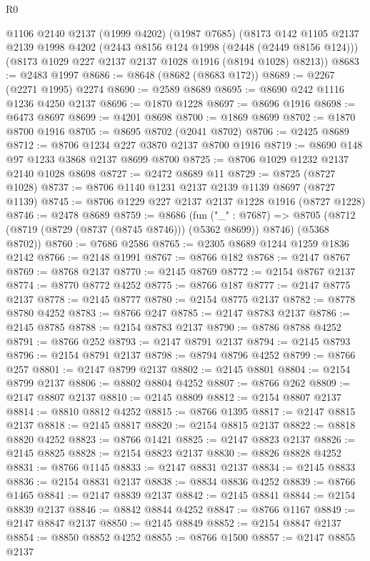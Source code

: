 \begin{lexlean}{R0}
\begin{coremodule}
    @1106
    @2140
    @2137
    (@1999 @4202)
    (@1987 @7685)
    (@8173
      @142
      @1105
      @2137
      @2139
      @1998
      @4202
      (@2443 @8156 @124 @1998 (@2448 (@2449 @8156 @124)))
      (@8173 @1029 @227 @2137 @2137 @1028 @1916 (@8194 @1028) @8213))
@8683 := @2483 @1997
@8686 := @8648 (@8682 (@8683 @172))
@8689 := @2267 (@2271 @1995) @2274
@8690 := @2589 @8689
@8695 := @8690 @242 @1116 @1236 @4250 @2137
@8696 := @1870 @1228
@8697 := @8696 @1916
@8698 := @6473 @8697
@8699 := @4201 @8698
@8700 := @1869 @8699
@8702 := @1870 @8700 @1916
@8705 := @8695 @8702 (@2041 @8702)
@8706 := @2425 @8689
@8712 := @8706 @1234 @227 @3870 @2137 @8700 @1916
@8719 := @8690 @148 @97 @1233 @3868 @2137 @8699 @8700
@8725 := @8706 @1029 @1232 @2137 @2140 @1028 @8698
@8727 := @2472 @8689 @11
@8729 := @8725 (@8727 @1028)
@8737 := @8706 @1140 @1231 @2137 @2139 @1139 @8697 (@8727 @1139)
@8745 := @8706 @1229 @227 @2137 @2137 @1228 @1916 (@8727 @1228)
@8746 := @2478 @8689
@8759 := @8686
    (fun ("_" : @7687) =>
    @8705 (@8712 (@8719 (@8729 (@8737 (@8745 @8746))) (@5362 @8699)) @8746) (@5368 @8702))
@8760 := @7686 @2586
@8765 := @2305 @8689 @1244 @1259 @1836 @2142
@8766 := @2148 @1991
@8767 := @8766 @182
@8768 := @2147 @8767
@8769 := @8768 @2137
@8770 := @2145 @8769
@8772 := @2154 @8767 @2137
@8774 := @8770 @8772 @4252
@8775 := @8766 @187
@8777 := @2147 @8775 @2137
@8778 := @2145 @8777
@8780 := @2154 @8775 @2137
@8782 := @8778 @8780 @4252
@8783 := @8766 @247
@8785 := @2147 @8783 @2137
@8786 := @2145 @8785
@8788 := @2154 @8783 @2137
@8790 := @8786 @8788 @4252
@8791 := @8766 @252
@8793 := @2147 @8791 @2137
@8794 := @2145 @8793
@8796 := @2154 @8791 @2137
@8798 := @8794 @8796 @4252
@8799 := @8766 @257
@8801 := @2147 @8799 @2137
@8802 := @2145 @8801
@8804 := @2154 @8799 @2137
@8806 := @8802 @8804 @4252
@8807 := @8766 @262
@8809 := @2147 @8807 @2137
@8810 := @2145 @8809
@8812 := @2154 @8807 @2137
@8814 := @8810 @8812 @4252
@8815 := @8766 @1395
@8817 := @2147 @8815 @2137
@8818 := @2145 @8817
@8820 := @2154 @8815 @2137
@8822 := @8818 @8820 @4252
@8823 := @8766 @1421
@8825 := @2147 @8823 @2137
@8826 := @2145 @8825
@8828 := @2154 @8823 @2137
@8830 := @8826 @8828 @4252
@8831 := @8766 @1145
@8833 := @2147 @8831 @2137
@8834 := @2145 @8833
@8836 := @2154 @8831 @2137
@8838 := @8834 @8836 @4252
@8839 := @8766 @1465
@8841 := @2147 @8839 @2137
@8842 := @2145 @8841
@8844 := @2154 @8839 @2137
@8846 := @8842 @8844 @4252
@8847 := @8766 @1167
@8849 := @2147 @8847 @2137
@8850 := @2145 @8849
@8852 := @2154 @8847 @2137
@8854 := @8850 @8852 @4252
@8855 := @8766 @1500
@8857 := @2147 @8855 @2137

\end{coremodule}
\end{lexlean}
